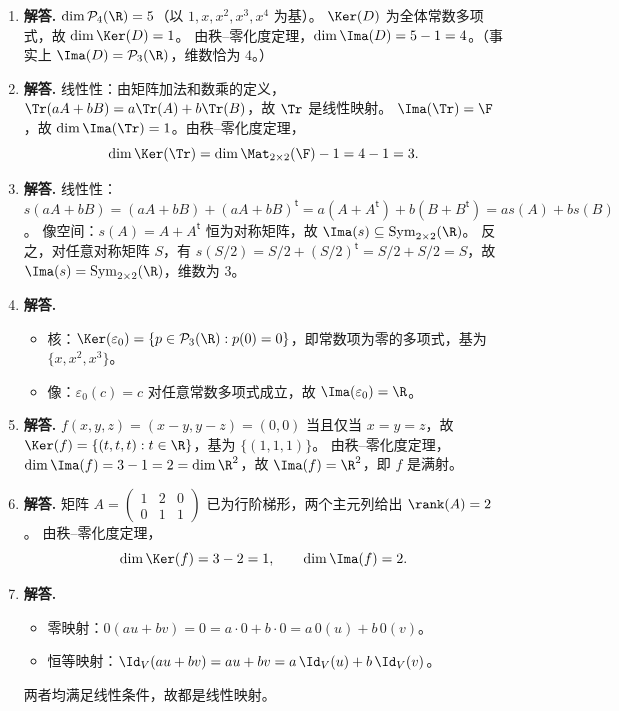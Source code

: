 \begin{enumerate}[label=\textbf{\arabic*.}, leftmargin=*, itemsep=1em]
\item \textbf{解答.}
$\dim\mathcal{P}_4(\R)=5$（以 $1,x,x^2,x^3,x^4$ 为基）。
$\Ker(D)$ 为全体常数多项式，故 $\dim\Ker(D)=1$。
由秩--零化度定理，$\dim\Ima(D)=5-1=4$。（事实上 $\Ima(D)=\mathcal{P}_3(\R)$，维数恰为 $4$。）

\item \textbf{解答.}
线性性：由矩阵加法和数乘的定义，$\Tr(aA+bB)=a\Tr(A)+b\Tr(B)$，故 $\Tr$ 是线性映射。
$\Ima(\Tr)=\F$，故 $\dim\Ima(\Tr)=1$。由秩--零化度定理，
\[
  \dim\Ker(\Tr)=\dim\Mat_{2\times 2}(\F)-1=4-1=3.
\]

\item \textbf{解答.}
线性性：$s(aA+bB)=(aA+bB)+(aA+bB)^\mathsf{t}=a(A+A^\mathsf{t})+b(B+B^\mathsf{t})=as(A)+bs(B)$。
像空间：$s(A)=A+A^\mathsf{t}$ 恒为对称矩阵，故 $\Ima(s)\subseteq\mathrm{Sym}_{2\times 2}(\R)$。
反之，对任意对称矩阵 $S$，有 $s(S/2)=S/2+(S/2)^\mathsf{t}=S/2+S/2=S$，故 $\Ima(s)=\mathrm{Sym}_{2\times 2}(\R)$，维数为 $3$。

\item \textbf{解答.}
\begin{itemize}
  \item 核：$\Ker(\varepsilon_0)=\{p\in\mathcal{P}_3(\R):p(0)=0\}$，即常数项为零的多项式，基为 $\{x,x^2,x^3\}$。
  \item 像：$\varepsilon_0(c)=c$ 对任意常数多项式成立，故 $\Ima(\varepsilon_0)=\R$。
\end{itemize}

\item \textbf{解答.}
$f(x,y,z)=(x-y,y-z)=(0,0)$ 当且仅当 $x=y=z$，故 $\Ker(f)=\{(t,t,t):t\in\R\}$，基为 $\{(1,1,1)\}$。
由秩--零化度定理，$\dim\Ima(f)=3-1=2=\dim\R^2$，故 $\Ima(f)=\R^2$，即 $f$ 是满射。

\item \textbf{解答.}
矩阵 $A=\begin{pmatrix}1&2&0\\0&1&1\end{pmatrix}$ 已为行阶梯形，两个主元列给出 $\rank(A)=2$。
由秩--零化度定理，
\[
  \dim\Ker(f)=3-2=1,\qquad \dim\Ima(f)=2.
\]

\item \textbf{解答.}
\begin{itemize}
  \item 零映射：$0(au+bv)=0=a\cdot 0+b\cdot 0=a\,0(u)+b\,0(v)$。
  \item 恒等映射：$\Id_V(au+bv)=au+bv=a\,\Id_V(u)+b\,\Id_V(v)$。
\end{itemize}
两者均满足线性条件，故都是线性映射。


\end{enumerate}
